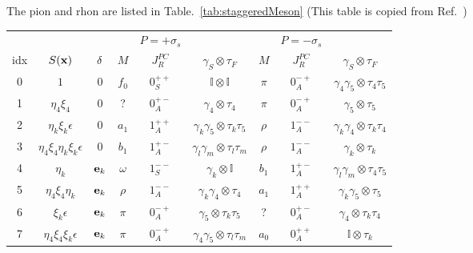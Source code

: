 The pion and rhon are listed in Table.~\ref{tab:staggeredMeson} (This table is copied from Ref.~\cite{staggeredMeson})
\begin{table}
\begin{center}
\begin{tabular}{c|c|c|ccc|ccc}
\hline
 & & & & $P=+\sigma _s$ & & & $P=-\sigma _s$ & \\
idx & $S({\bf x})$ & ${\bf \delta}$ & $M$ & $J^{PC}_R$ & $\gamma _S\otimes \tau _F$ & $M$ & $J^{PC}_R$ & $\gamma _S\otimes \tau _F$\\
\hline
0  & $1$                                         & $0$                             & $f_0$    & $0^{++}_S$ & $\mathbb{I}\otimes \mathbb{I}$               & $\pi$    & $0^{-+}_A$ &  $\gamma_4\gamma _5\otimes \tau _4\tau _5$ \\
1  & $\eta _4 \xi _4$                            & $0$                             & ?        & $0^{+-}_A$ & $\gamma _4 \otimes \tau _4$                  & $\pi$    & $0^{-+}_A$ &  $\gamma _5 \otimes \tau _5$ \\
2  & $\eta _k \xi _k \epsilon$                   & $0$                             & $a_1$    & $1^{++}_A$ & $\gamma _k\gamma _5 \otimes \tau _k\tau _5$  & $\rho$   & $1^{--}_A$ &  $\gamma _k\gamma _4 \otimes \tau _k\tau _4$ \\
3  & $\eta _4 \xi _4\eta _k \xi _k \epsilon$     & $0$                             & $b_1$    & $1^{+-}_A$ & $\gamma _l\gamma _m \otimes \tau _l\tau _m$  & $\rho$   & $1^{--}_A$ &  $\gamma _k \otimes \tau _k$ \\
4  & $\eta _k$                                   & ${\bf e}_k$                     & $\omega$ & $1^{--}_S$ & $\gamma _k\otimes \mathbb{I}$                & $b_1$    & $1^{+-}_A$ & $\gamma _l\gamma _m\otimes \tau _4\tau _5$ \\
5  & $\eta _4\xi _4\eta _k$                      & ${\bf e}_k$                     & $\rho$   & $1^{--}_A$ & $\gamma _k\gamma _4\otimes \tau _4$          & $a_1$    & $1^{++}_A$ & $\gamma _k\gamma _5\otimes \tau _5$ \\
6  & $\xi _k\epsilon $                           & ${\bf e}_k$                     & $\pi$    & $0^{-+}_A$ & $\gamma _5 \otimes \tau _k\tau _5$           & ?        & $0^{+-}_A$ & $\gamma _4 \otimes \tau _k \tau _4$ \\
7  & $\eta _4\xi_4\xi_k\epsilon$                 & ${\bf e}_k$                     & $\pi$    & $0^{-+}_A$ & $\gamma _4\gamma _5\otimes \tau _l \tau _m$  & $a_0$    & $0^{++}_A$ & $\mathbb{I}\otimes \tau _k$ \\

\end{tabular}
\end{center}
\end{table}
